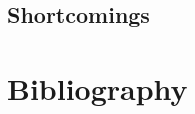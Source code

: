 \documentclass[12pt,a4paper,oneside,openright]{report} %
\begin{document}
\chapter{Shortcomings}
\label{app:shortcomings}


\part{Bibliography}


\end{document}
